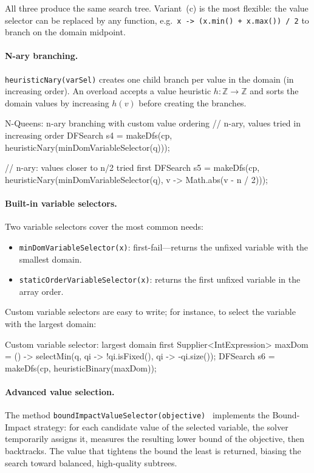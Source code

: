 \documentclass[11pt, a4paper]{scrartcl}
\begin{document}
\noindent
All three produce the same search tree.
Variant~(c) is the most flexible: the value selector can be replaced by any function, e.g.\ \texttt{x -> (x.min() + x.max()) / 2} to branch on the domain midpoint.

\paragraph{N-ary branching.}
\texttt{heuristicNary(varSel)} creates one child branch per value in the domain (in increasing order).
An overload accepts a value heuristic $h : \mathbb{Z} \to \mathbb{Z}$ and sorts the domain values by increasing $h(v)$ before creating the branches.

\begin{codebox}[label={lst:nqueens-nary}]{N-Queens: n-ary branching with custom value ordering}
// n-ary, values tried in increasing order
DFSearch s4 = makeDfs(cp,
    heuristicNary(minDomVariableSelector(q)));

// n-ary: values closer to n/2 tried first
DFSearch s5 = makeDfs(cp,
    heuristicNary(minDomVariableSelector(q),
                  v -> Math.abs(v - n / 2)));
\end{codebox}

\paragraph{Built-in variable selectors.}
Two variable selectors cover the most common needs:
\begin{itemize}
    \item \texttt{minDomVariableSelector(x)}: first-fail---returns the unfixed variable with the smallest domain.
    \item \texttt{staticOrderVariableSelector(x)}: returns the first unfixed variable in the array order.
\end{itemize}

\noindent
Custom variable selectors are easy to write; for instance, to select the variable with the largest domain:
\begin{codebox}{Custom variable selector: largest domain first}
Supplier<IntExpression> maxDom = () ->
    selectMin(q, qi -> !qi.isFixed(), qi -> -qi.size());
DFSearch s6 = makeDfs(cp, heuristicBinary(maxDom));
\end{codebox}


\paragraph{Advanced value selection.}
The method \texttt{boundImpactValueSelector(objective)}~\cite{fages2017making} implements the Bound-Impact strategy: for each candidate value of the selected variable, the solver temporarily assigns it, measures the resulting lower bound of the objective, then backtracks. The value that tightens the bound the least is returned, biasing the search toward balanced, high-quality subtrees.
\end{document}
